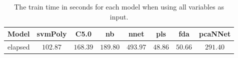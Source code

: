 \begin{table}[!ht]
	\centering
	\begin{tabular}{|c|c|c|c|c|c|c|c|}
		\hline
		Model & svmPoly & C5.0 & nb & nnet & pls & fda & pcaNNet \\ \hline
		elapsed & $102.87$ & $168.39$ & $189.80$ & $493.97$ & $48.86$ & $50.66$ & $291.40$ \\ \hline
	\end{tabular}
	\caption{The train time in seconds for each model when using all variables as input.}
	\label{tab:time:reverse:all:train}
\end{table}
